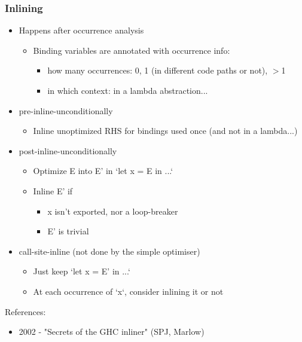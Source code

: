 \documentclass[aspectratio=169]{beamer}
\begin{document}
\begin{frame}
  \frametitle{Inlining}
  \begin{itemize}
    \item Happens after occurrence analysis
      \begin{itemize}
        \item Binding variables are annotated with occurrence info:
        \begin{itemize}
          \item how many occurrences: 0, 1 (in different code paths or not), $>$1
          \item in which context: in a lambda abstraction...
        \end{itemize}
      \end{itemize}

    \item pre-inline-unconditionally
      \begin{itemize}
        \item Inline unoptimized RHS for bindings used once (and not in a
          lambda...)
      \end{itemize}
    
    \item post-inline-unconditionally
      \begin{itemize}
        \item Optimize E into E' in `let x = E in ...`
        \item Inline E' if
          \begin{itemize}
            \item x isn't exported, nor a loop-breaker
            \item E' is trivial
          \end{itemize}
      \end{itemize}

    \item call-site-inline (not done by the simple optimiser)
      \begin{itemize}
        \item Just keep `let x = E' in ...`
        \item At each occurrence of `x`, consider inlining it or not
      \end{itemize}

  \end{itemize}
  
  References:
  \begin{itemize}
    \item 2002 - "Secrets of the GHC inliner" (SPJ, Marlow)
  \end{itemize}

\end{frame}
\end{document}
